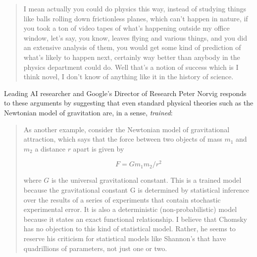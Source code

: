 \documentclass{article}
\begin{document}
\begin{quotation}
I mean actually you could do physics this way, instead of studying things like balls rolling down frictionless planes, which can't happen in nature, if you took a ton of video tapes of what's happening outside my office window, let's say, you know, leaves flying and various things, and you did an extensive analysis of them, you would get some kind of prediction of what's likely to happen next, certainly way better than anybody in the physics department could do. Well that's a notion of success which is I think novel, I don't know of anything like it in the history of science.
\end{quotation}

Leading AI researcher and Google's Director of Research Peter Norvig responds to these arguments by suggesting that even standard physical theories such as the Newtonian model of gravitation are, in a sense, \emph{trained}:

\begin{quotation}
As another example, consider the Newtonian model of gravitational attraction, which says that the force between two objects of mass $m_1$ and $m_2$ a distance $r$ apart is given by

\begin{equation*}
F = G m_1 m_2 / r^2
\end{equation*}

where $G$ is the universal gravitational constant. This is a trained model because the gravitational constant G is determined by statistical inference over the results of a series of experiments that contain stochastic experimental error. It is also a deterministic (non-probabilistic) model because it states an exact functional relationship. I believe that Chomsky has no objection to this kind of statistical model. Rather, he seems to reserve his criticism for statistical models like Shannon's that have quadrillions of parameters, not just one or two.
\end{quotation}
\end{document}
